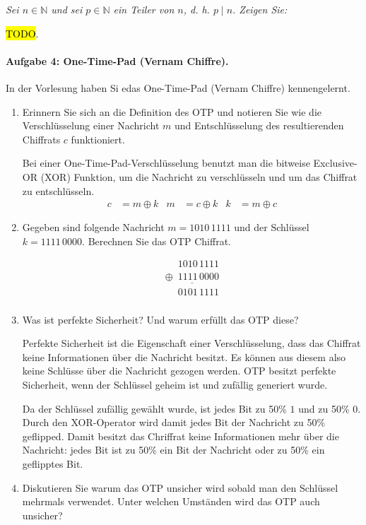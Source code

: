 \documentclass[
  ngerman,
  DIV=12
]{scrartcl}
\begin{document}
\bigskip\noindent
\emph{Sei $n \in \mathbb{N}$ und sei $p \in \mathbb{N}$ ein Teiler von $n$, d. h. $p \mid n$. Zeigen Sie:}

\medskip\noindent
\hl{TODO}.

\paragraph{Aufgabe 4: One-Time-Pad (Vernam Chiffre).} In der Vorlesung haben Si edas One-Time-Pad (Vernam Chiffre) kennengelernt.

\begin{enumerate}[label=\alph*)]
\item Erinnern Sie sich an die Definition des OTP und notieren Sie wie die Verschlüsselung einer Nachricht $m$ und Entschlüsselung des resultierenden Chiffrats $c$ funktioniert.

Bei einer One-Time-Pad-Verschlüsselung benutzt man die bitweise Exclusive-OR (XOR) Funktion, um die Nachricht zu verschlüsseln und um das Chiffrat zu entschlüsseln. 
\begin{align*}
  c &= m \oplus k & m &= c \oplus k & k &= m \oplus c
\end{align*}
\item Gegeben sind folgende Nachricht $m = 1010\,1111$ und der Schlüssel $k = 1111\,0000$. Berechnen Sie das OTP Chiffrat.

\begin{equation*}
\begin{array}{c}
\phantom{\oplus9}1010\,1111\\
\underline{\oplus\phantom{9}1111\,0000}\\
\phantom{\oplus9}0101\,1111\\
\end{array}
\end{equation*}
\item Was ist perfekte Sicherheit? Und warum erfüllt das OTP diese?

Perfekte Sicherheit ist die Eigenschaft einer Verschlüsselung, dass das Chiffrat keine Informationen über die Nachricht besitzt. Es können aus diesem also keine Schlüsse über die Nachricht gezogen werden. OTP besitzt perfekte Sicherheit, wenn der Schlüssel geheim ist und zufällig generiert wurde. 

Da der Schlüssel zufällig gewählt wurde, ist jedes Bit zu 50\% $1$ und zu 50\% $0$. Durch den XOR-Operator wird damit jedes Bit der Nachricht zu 50\% geflipped. Damit besitzt das Chriffrat keine Informationen mehr über die Nachricht: jedes Bit ist zu 50\% ein Bit der Nachricht oder zu 50\% ein geflipptes Bit. 
\item Diskutieren Sie warum das OTP unsicher wird sobald man den Schlüssel mehrmals verwendet. Unter welchen Umständen wird das OTP auch unsicher?


\end{enumerate}
\end{document}
